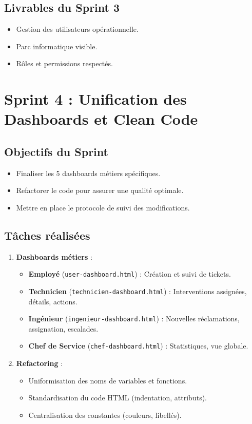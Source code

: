 \documentclass[12pt,a4paper,twoside]{report}
\begin{document}
\subsection{Livrables du Sprint 3}

\begin{itemize}
    \item Gestion des utilisateurs opérationnelle.
    \item Parc informatique visible.
    \item Rôles et permissions respectés.
\end{itemize}

\section{Sprint 4 : Unification des Dashboards et Clean Code}

\subsection{Objectifs du Sprint}

\begin{itemize}
    \item Finaliser les 5 dashboards métiers spécifiques.
    \item Refactorer le code pour assurer une qualité optimale.
    \item Mettre en place le protocole de suivi des modifications.
\end{itemize}

\subsection{Tâches réalisées}

\begin{enumerate}
    \item \textbf{Dashboards métiers} :
    \begin{itemize}
        \item \textbf{Employé} (\texttt{user-dashboard.html}) : Création et suivi de tickets.
        \item \textbf{Technicien} (\texttt{technicien-dashboard.html}) : Interventions assignées, détails, actions.
        \item \textbf{Ingénieur} (\texttt{ingenieur-dashboard.html}) : Nouvelles réclamations, assignation, escalades.
        \item \textbf{Chef de Service} (\texttt{chef-dashboard.html}) : Statistiques, vue globale.
    \end{itemize}
    \item \textbf{Refactoring} :
    \begin{itemize}
        \item Uniformisation des noms de variables et fonctions.
        \item Standardisation du code HTML (indentation, attributs).
        \item Centralisation des constantes (couleurs, libellés).
    \end{itemize}
\end{enumerate}
\end{document}
